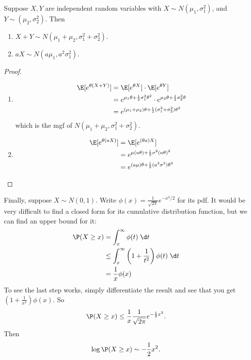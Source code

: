 \documentclass[a4paper]{article}
\begin{document}
\begin{thm}
  Suppose $X, Y$ are independent random variables with $X\sim N(\mu_1, \sigma_1^2)$, and $Y\sim (\mu_2, \sigma_2^2)$. Then
  \begin{enumerate}
    \item $X + Y \sim N(\mu_1 + \mu_2 , \sigma_1^2 + \sigma_2^2)$.
    \item $aX \sim N(a\mu_1, a^2 \sigma_1^2)$.
  \end{enumerate}
\end{thm}

\begin{proof}\leavevmode
  \begin{enumerate}
    \item
      \begin{align*}
        \E[e^{\theta(X + Y)}] &= \E[e^{\theta X}] \cdot \E[e^{\theta Y}]\\
        &= e^{\mu_1 \theta + \frac{1}{2}\sigma_1^2\theta^2} \cdot e^{\mu_2 \theta + \frac{1}{2}\sigma_2^2 \theta}\\
        &= e^{(\mu_1 + \mu_2)\theta + \frac{1}{2}(\sigma_1^2 + \sigma_2^2)\theta^2}
      \end{align*}
      which is the mgf of $N(\mu_1 + \mu_2, \sigma_1^2 + \sigma_2^2)$.
    \item
      \begin{align*}
        \E[e^{\theta (aX)}] &= \E[e^{(\theta a)X}]\\
        &= e^{\mu(a\theta) + \frac{1}{2}\sigma^2 (a \theta)^2}\\
        &= e^{(a\mu)\theta + \frac{1}{2}(a^2\sigma^2)\theta^2}
      \end{align*}
  \end{enumerate}
\end{proof}

Finally, suppose $X\sim N(0, 1)$. Write $\phi(x) = \frac{1}{\sqrt{2\pi}} e^{-x^2/2}$ for its pdf. It would be very difficult to find a closed form for its cumulative distribution function, but we can find an upper bound for it:
\begin{align*}
  \P(X \geq x) &= \int_x^\infty \phi(t)\;\d t\\
  &\leq \int_x^\infty \left(1 + \frac{1}{t^2}\right)\phi(t)\;\d t \\
  &= \frac{1}{x}\phi(x)
\end{align*}
To see the last step works, simply differentiate the result and see that you get $\left(1 + \frac{1}{x^2}\right)\phi(x)$.
So
\[
  \P(X \geq x) \leq \frac{1}{x}\frac{1}{\sqrt{2\pi}}e^{-\frac{1}{2}x^2}.
\]
Then
\[
  \log \P(X \geq x)\sim -\frac{1}{2}x^2.
\]
\end{document}
